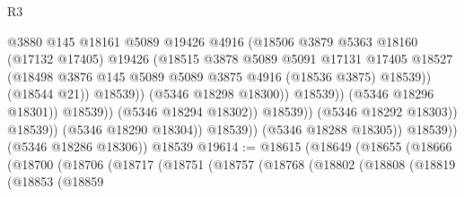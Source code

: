 \begin{lexlean}{R3}
\begin{coremodule}
                                              @3880
                                              @145
                                              @18161
                                              @5089
                                              @19426
                                              @4916
                                              (@18506
                                                @3879
                                                @5363
                                                @18160
                                                (@17132 @17405)
                                                @19426
                                                (@18515
                                                  @3878
                                                  @5089
                                                  @5091
                                                  @17131
                                                  @17405
                                                  @18527
                                                  (@18498
                                                    @3876
                                                    @145
                                                    @5089
                                                    @5089
                                                    @3875
                                                    @4916
                                                    (@18536 @3875)
                                                    @18539))
                                                (@18544 @21))
                                              @18539))
                                          (@5346 @18298 @18300))
                                        @18539))
                                    (@5346 @18296 @18301))
                                  @18539))
                              (@5346 @18294 @18302))
                            @18539))
                        (@5346 @18292 @18303))
                      @18539))
                  (@5346 @18290 @18304))
                @18539))
            (@5346 @18288 @18305))
          @18539))
      (@5346 @18286 @18306))
    @18539
@19614 := @18615
    (@18649
      (@18655
        (@18666
          (@18700
            (@18706
              (@18717
                (@18751
                  (@18757
                    (@18768
                      (@18802
                        (@18808
                          (@18819
                            (@18853
                              (@18859

\end{coremodule}
\end{lexlean}
